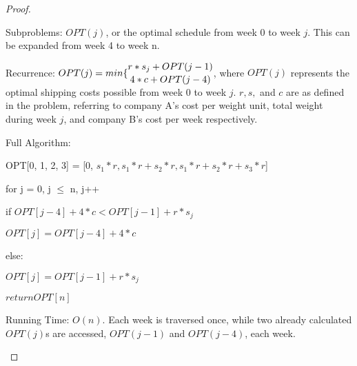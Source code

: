 \documentclass[11pt, oneside]{article}   	%
\begin{document}
\begin{proof}
\begin{description}

Subproblems: $OPT(j)$, or the optimal schedule from week 0 to week $j$. This can be expanded from week 4 to week n.

Recurrence: $OPT(j) = min \{\stackanchor{$r * s_j + OPT(j-1)$}{$4 * c + OPT(j-4)$}$, where $OPT(j)$ represents the optimal shipping costs possible from week 0 to week $j$. $r, s,$ and $c$ are as defined in the problem, referring to company A's cost per weight unit, total weight during week $j$, and company B's cost per week respectively.

Full Algorithm: 

OPT[0, 1, 2, 3] = [0, $s_1 * r, s_1*r + s_2 * r, s_1*r + s_2*r + s_3*r$]

for j = 0, j $\leq$ n, j++

	\quad if $OPT[j - 4] + 4*c < OPT[j-1] + r*s_j$

	\quad \quad 	$OPT[j] = OPT[j-4] + 4 * c$

	\quad else:

	\quad \quad  $OPT[j] = OPT[j-1] + r*s_j$

$return OPT[n]$

Running Time: $O(n)$. Each week is traversed once, while two already calculated $OPT(j)$s are accessed, $OPT(j-1)$ and $OPT(j-4)$, each week.

\end{description}
\end{proof}
\end{document}
